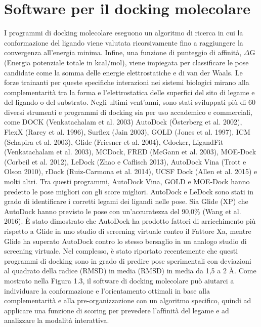 \section{Software per il docking molecolare}\label{sec:1.3}
I programmi di docking molecolare eseguono un algoritmo di ricerca in cui la conformazione del ligando viene valutata ricorsivamente fino a raggiungere la convergenza all'energia minima. Infine, una funzione di punteggio di affinità, $\Delta$G (Energia potenziale totale in kcal/mol), viene impiegata per classificare le pose candidate come la somma delle energie elettrostatiche e di van der Waals. Le forze trainanti per queste specifiche interazioni nei sistemi biologici mirano alla complementarità tra la forma e l'elettrostatica delle superfici del sito di legame e del ligando o del substrato. \newline
Negli ultimi vent'anni, sono stati sviluppati più di 60 diversi strumenti e programmi di docking sia per uso accademico e commerciali, come DOCK (Venkatachalam et al. 2003) AutoDock (Österberg et al. 2002), FlexX (Rarey et al. 1996), Surflex (Jain 2003), GOLD (Jones et al. 1997), ICM (Schapira et al. 2003), Glide (Friesner et al. 2004), Cdocker, LigandFit (Venkatachalam et al. 2003), MCDock, FRED (McGann et al. 2003), MOE-Dock (Corbeil et al. 2012), LeDock (Zhao e Caflisch 2013), AutoDock Vina (Trott e Olson 2010), rDock (Ruiz-Carmona et al. 2014), UCSF Dock (Allen et al. 2015) e molti altri. \newline 
Tra questi programmi, AutoDock Vina, GOLD e MOE-Dock hanno predetto le pose migliori con gli score migliori. AutoDock e LeDock sono stati in grado di identificare i corretti legami dei ligandi nelle pose. Sia Glide (XP) che AutoDock hanno previsto le pose con un'accuratezza del 90,0\% (Wang et al. 2016). È stato dimostrato che AutoDock ha prodotto fattori di arricchimento più rispetto a Glide in uno studio di screening virtuale contro il Fattore Xa, mentre Glide ha superato AutoDock contro lo stesso bersaglio in un analogo studio di screening virtuale. Nel complesso, è stato riportato recentemente che questi programmi di docking sono in grado di predire pose sperimentali con deviazioni al quadrato della radice (RMSD) in media (RMSD) in media da 1,5 a 2 Å\cite{pagadala2017software}.\newline 
Come mostrato nella Figura 1.3, il software di docking molecolare può aiutarci a individuare la conformazione e l'orientamento ottimali in base alla complementarità e alla pre-organizzazione con un algoritmo specifico, quindi ad applicare una funzione di scoring per prevedere l'afﬁnità del legame e ad analizzare la modalità interattiva\cite{fan2019progress}.

